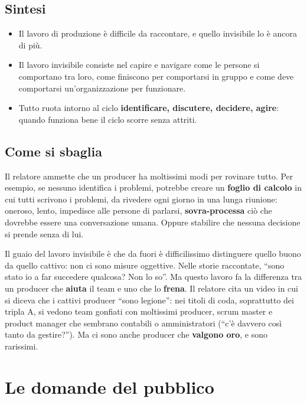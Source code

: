 \subsection{Sintesi}

\begin{itemize}
  \item Il lavoro di produzione è difficile da raccontare, e quello invisibile lo è
        ancora di più.
  \item Il lavoro invisibile consiste nel capire e navigare come le persone si
        comportano tra loro, come finiscono per comportarsi in gruppo e come deve
        comportarsi un'organizzazione per funzionare.
  \item Tutto ruota intorno al ciclo \textbf{identificare, discutere, decidere,
        agire}: quando funziona bene il ciclo scorre senza attriti.
\end{itemize}

\subsection{Come si sbaglia}

Il relatore ammette che un producer ha moltissimi modi per rovinare tutto. Per
esempio, se nessuno identifica i problemi, potrebbe creare un \textbf{foglio di
calcolo} in cui tutti scrivono i problemi, da rivedere ogni giorno in una lunga
riunione: oneroso, lento, impedisce alle persone di parlarsi, \textbf{sovra-processa}
ciò che dovrebbe essere una conversazione umana. Oppure stabilire che nessuna
decisione si prende senza di lui.

Il guaio del lavoro invisibile è che da fuori è difficilissimo distinguere quello
buono da quello cattivo: non ci sono misure oggettive. Nelle storie raccontate,
``sono stato io a far succedere qualcosa? Non lo so''. Ma questo lavoro fa la
differenza tra un producer che \textbf{aiuta} il team e uno che lo
\textbf{frena}. Il relatore cita un video in cui si diceva che i cattivi producer
``sono legione'': nei titoli di coda, soprattutto dei tripla A, si vedono team
gonfiati con moltissimi producer, scrum master e product manager che sembrano
contabili o amministratori (``c'è davvero così tanto da gestire?''). Ma ci sono
anche producer che \textbf{valgono oro}, e sono rarissimi.

\section{Le domande del pubblico}
\label{sec:c3-3-domande}

